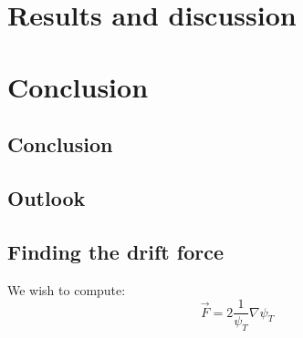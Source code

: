 \documentclass[a4paper, 10pt]{article}
\begin{document}
\section{Results and discussion}
\section{Conclusion}
\subsection{Conclusion}

\subsection{Outlook}

\begin{appendices}
\section{Finding the drift force}
We wish to compute:
\begin{equation}
\vec{F}=2\frac{1}{\psi_T}\nabla \psi_T
\end{equation}

\end{appendices}
\end{document}
